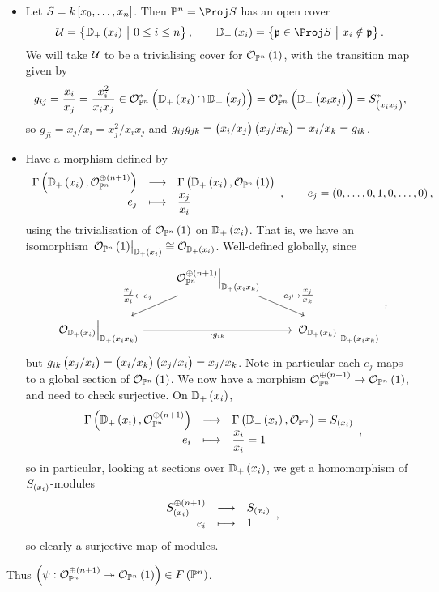 \begin{itemize}
\item Let $ S = k\sbr{x_0, \dots, x_n} $. Then $ \PP^n = \Proj S $ has an open cover
$$ \UUU = \cbr{\DD_+\br{x_i} \st 0 \le i \le n}, \qquad \DD_+\br{x_i} = \cbr{\ppp \in \Proj S \st x_i \notin \ppp}. $$
We will take $ \mathcal{U} $ to be a trivialising cover for $ \OOO_{\PP^n}\br{1} $, with the transition map given by
$$ g_{ij} = \dfrac{x_i}{x_j} = \dfrac{x_i^2}{x_ix_j} \in \OOO_{\PP^n}^*\br{\DD_+\br{x_i} \cap \DD_+\br{x_j}} = \OOO_{\PP^n}^*\br{\DD_+\br{x_ix_j}} = S_{\br{x_ix_j}}^*, $$
so $ g_{ji} = x_j / x_i = x_j^2 / x_ix_j $ and $ g_{ij}g_{jk} = \br{x_i / x_j}\br{x_j / x_k} = x_i / x_k = g_{ik} $.
\item Have a morphism defined by
$$ \function{\Gamma\br{\DD_+\br{x_i}, \OOO_{\PP^n}^{\oplus \br{n + 1}}}}{\Gamma\br{\DD_+\br{x_i}, \OOO_{\PP^n}\br{1}}}{e_j}{\dfrac{x_j}{x_i}}, \qquad e_j = \br{0, \dots, 0, 1, 0, \dots, 0}, $$
using the trivialisation of $ \OOO_{\PP^n}\br{1} $ on $ \DD_+\br{x_i} $. That is, we have an isomorphism $ \eval{\OOO_{\PP^n}\br{1}}_{\DD_+\br{x_i}} \cong \OOO_{\DD_+\br{x_i}} $. Well-defined globally, since
$$
\begin{tikzcd}
& \eval{\OOO_{\PP^n}^{\oplus \br{n + 1}}}_{\DD_+\br{x_ix_k}} \arrow{dl}[swap]{\tfrac{x_j}{x_i} \mapsfrom e_j} \arrow{dr}{e_j \mapsto \tfrac{x_j}{x_k}} & \\
\eval{\OOO_{\DD_+\br{x_i}}}_{\DD_+\br{x_ix_k}} \arrow{rr}[swap]{\cdot g_{ik}} & & \eval{\OOO_{\DD_+\br{x_k}}}_{\DD_+\br{x_ix_k}}
\end{tikzcd},
$$
but $ g_{ik}\br{x_j / x_i} = \br{x_i / x_k}\br{x_j / x_i} = x_j / x_k $. Note in particular each $ e_j $ maps to a global section of $ \OOO_{\PP^n}\br{1} $. We now have a morphism $ \OOO_{\PP^n}^{\oplus \br{n + 1}} \to \OOO_{\PP^n}\br{1} $, and need to check surjective. On $ \DD_+\br{x_i} $,
$$ \function{\Gamma\br{\DD_+\br{x_i}, \OOO_{\PP^n}^{\oplus \br{n + 1}}}}{\Gamma\br{\DD_+\br{x_i}, \OOO_{\PP^n}} = S_{\br{x_i}}}{e_i}{\dfrac{x_i}{x_i} = 1}, $$
so in particular, looking at sections over $ \DD_+\br{x_i} $, we get a homomorphism of $ S_{\br{x_i}} $-modules
$$ \function{S_{\br{x_i}}^{\oplus \br{n + 1}}}{S_{\br{x_i}}}{e_i}{1}, $$
so clearly a surjective map of modules.
\end{itemize}
Thus $ \br{\psi : \OOO_{\PP^n}^{\oplus \br{n + 1}} \twoheadrightarrow \OOO_{\PP^n}\br{1}} \in F\br{\PP^n} $.

\pagebreak

